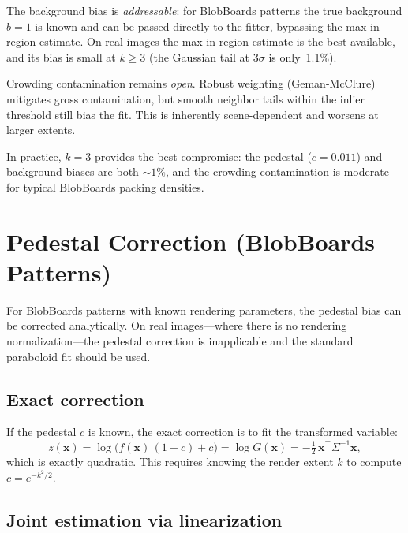 \documentclass[11pt]{article}
\begin{document}
The background bias is \emph{addressable}: for BlobBoards patterns the
true background $b=1$ is known and can be passed directly to the
fitter, bypassing the max-in-region estimate.  On real images the
max-in-region estimate is the best available, and its bias is small at
$k \geq 3$ (the Gaussian tail at $3\sigma$ is only~1.1\%).

Crowding contamination remains \emph{open}.  Robust weighting
(Geman-McClure) mitigates gross contamination, but smooth neighbor
tails within the inlier threshold still bias the fit.  This is
inherently scene-dependent and worsens at larger extents.

\noindent
In practice, $k = 3$ provides the best compromise:
the pedestal ($c = 0.011$) and background biases are both $\sim\!1\%$,
and the crowding contamination is moderate for typical BlobBoards
packing densities.

\section{Pedestal Correction (BlobBoards Patterns)}

For BlobBoards patterns with known rendering parameters, the pedestal
bias can be corrected analytically.  On real images---where there is no
rendering normalization---the pedestal correction is inapplicable and
the standard paraboloid fit should be used.

\subsection{Exact correction}

If the pedestal $c$ is known, the exact correction is to fit the
transformed variable:
\begin{equation}
  z(\mathbf{x}) = \log\!\bigl(f(\mathbf{x})\,(1 - c) + c\bigr)
    = \log G(\mathbf{x})
    = -\tfrac{1}{2}\,\mathbf{x}^\top \Sigma^{-1} \mathbf{x},
  \label{eq:exact-correction}
\end{equation}
which is exactly quadratic.  This requires knowing the render extent $k$
to compute $c = e^{-k^2/2}$.

\subsection{Joint estimation via linearization}
\label{sec:pedestal-linearization}
\end{document}

